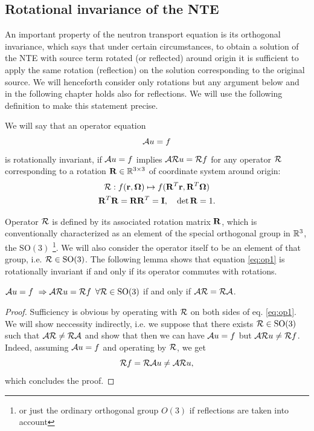 \subsection{Rotational invariance of the NTE}\label{sec:rotinv}
An important property of the neutron transport equation is its orthogonal invariance, which says that under certain
circumstances, to obtain a solution of the NTE with source term rotated (or reflected) around origin it is sufficient to
apply the same rotation (reflection) on the solution corresponding to the original source. We will henceforth consider
only rotations but any argument below and in the following chapter holds also for reflections. We will use the
following definition to make this statement precise.
 
\begin{definition}
We will say that an
operator equation
\begin{equation}\label{eq:op1} 
\genop{A}u = f
\end{equation}
is rotationally invariant, if $\genop{A}u = f$ implies $\genop{A}\genop{R}u = \genop{R}f$ for any operator
$\op{\genop{R}}$ corresponding to a rotation $\mat{R}\in\R[3\times3]$ of coordinate system around origin:
\begin{equation}\label{eq:def_rot}
\begin{gathered}
\genop{R}: f(\br,\bomega) \mapsto f(\mat{R}^T\br,\mat{R}^T\bomega)\\
\mat{R}^T\mat{R} = \mat{R}\mat{R}^T = \mat{I},\quad \det \mat{R} = 1.
\end{gathered}
\end{equation}
\end{definition}
Operator $\genop{R}$ is defined by its associated rotation matrix $\mat{R}$, which is conventionally
characterized as an element of the special orthogonal group in $\R[3]$, the $\mathrm{SO}(3)$ \footnote{or just the
ordinary orthogonal group $O(3)$ if reflections are taken into account}.
We will also consider the operator itself to be an element of that group, i.e.
$\genop{R} \in \mathrm{SO}(3)$. The following lemma shows that equation \eqref{eq:op1} is rotationally invariant if and
only if its operator commutes with rotations.
\begin{lemma}\label{lemma1}
	$\genop{A}u = f \ \Rightarrow \genop{A}\genop{R}u = \genop{R}f\,\ \forall \genop{R}\in \mathrm{SO}(3)$ if and only if $\genop{A}\genop{R} = \genop{R}\genop{A}$.
\end{lemma}
\begin{proof}
	Sufficiency is obvious by operating with $\genop{R}$ on both sides of eq. \eqref{eq:op1}.
	We will show neccessity indirectly, i.e. we suppose that there exists $\genop{R}\in\mathrm{SO}(3)$ such that $\genop{A}\genop{R} \neq \genop{R}\genop{A}$
	and show that then we can have $\genop{A}u = f$ but $\genop{A}\genop{R}u \neq \genop{R}f$. Indeed, assuming $\genop{A}u = f$ and operating by $\genop{R}$, we get  
	$$
		\genop{R}f = \genop{R}\genop{A}u \neq \genop{A}\genop{R}u,
	$$
	which concludes the proof.
\end{proof}

